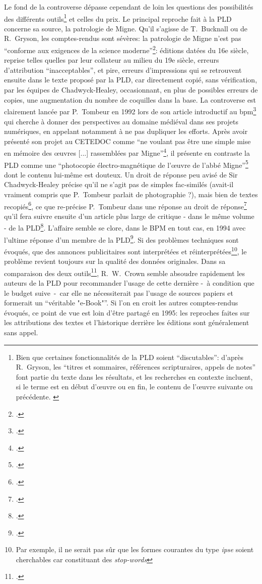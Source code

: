 Le fond de la controverse dépasse cependant de loin les questions des possibilités des différents outils\footnote{Bien que certaines fonctionnalités de la PLD soient \enquote{discutables}: d'après R.~Gryson, les \enquote{titres et sommaires, références scripturaires, appels de notes} font partie du texte dans les résultats, et les recherches en contexte incluent, si le terme est en début d'œuvre ou en fin, le contenu de l'œuvre suivante ou précédente. \cite[p. 148]{gryson_patrologia_1997}} et celles du prix. Le principal reproche fait à la PLD concerne sa source, la patrologie de Migne. Qu'il s'agisse de T.~Bucknall ou de R.~Gryson, les comptes-rendus sont sévères: la patrologie de Migne n'est pas \enquote{conforme aux exigences de la science moderne}\footcite[p. 147]{gryson_patrologia_1997}: éditions datées du 16e siècle, reprise telles quelles par leur collateur au milieu du 19e siècle, erreurs d'attribution \enquote{inacceptables}, et pire, erreurs d'impressions qui se retrouvent ensuite dans le texte proposé par la PLD, car directement copié, sans vérification, par les équipes de Chadwyck-Healey, occasionnant, en plus de possibles erreurs de copies, une augmentation du nombre de coquilles dans la base. La controverse est clairement lancée par P.~Tombeur en 1992 lors de son article introductif au \acrfull{bpm}\footcite{tombeur_informatique_1992} qui cherche à donner des perspectives au domaine médiéval dans ses projets numériques, en appelant notamment à ne pas dupliquer les efforts. Après avoir présenté son projet au CETEDOC comme \enquote{ne voulant pas être une simple mise en mémoire des œuvres {[...]} rassemblées par Migne}\footcite[p. 44]{tombeur_informatique_1992}, il présente en contraste la PLD comme une \enquote{photocopie électro-magnétique de l'œuvre de l'abbé Migne}\footcite[p. 45]{tombeur_informatique_1992} dont le contenu lui-même est douteux. Un droit de réponse peu avisé de Sir Chadwyck-Healey précise qu'il ne s'agit pas de simples fac-similés (avait-il vraiment compris que P.~Tombeur parlait de photographie ?), mais bien de textes recopiés\footcite{chadwick-healey_droit_1993}, ce que re-précise P.~Tombeur dans une réponse au droit de réponse\footcite{tombeur_reponse_1993} qu'il fera suivre ensuite d'un article plus large de critique - dans le même volume - de la PLD\footcite{tombeur_pld_1993}. L'affaire semble se clore, dans le BPM en tout cas, en 1994 avec l'ultime réponse d'un membre de la PLD\footcite{jordan_facts_1994}. Si des problèmes techniques sont évoqués, que des annonces publicitaires sont interprétées et réinterprétées\footnote{Par exemple, il ne serait pas sûr que les formes courantes du type \textit{ipse} soient cherchables car constituant des \textit{stop-words}}, le problème revient toujours sur la qualité des données originales. Dans sa comparaison des deux outils\footcite{crown_comparing_2000}, R.~W.~Crown semble absoudre rapidement les auteurs de la PLD pour recommander l'usage de cette dernière -~à condition que le budget suive~-~car elle ne nécessiterait pas l'usage de sources papiers et formerait un \enquote{véritable "e-Book"}. Si l'on en croit les autres comptes-rendus évoqués, ce point de vue est loin d'être partagé en 1995: les reproches faites sur les attributions des textes et l'historique derrière les éditions sont généralement sans appel.

